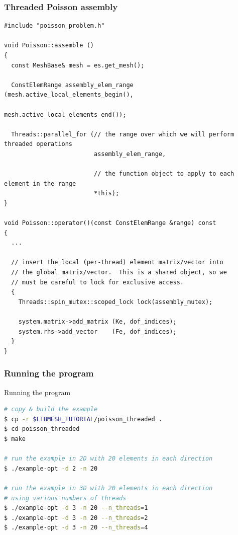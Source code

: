 \begin{frame}
  \frametitle{Threaded Poisson assembly}

  \begin{lstlisting}
#include "poisson_problem.h"

void Poisson::assemble ()
{
  const MeshBase& mesh = es.get_mesh();

  ConstElemRange assembly_elem_range (mesh.active_local_elements_begin(),
                                      mesh.active_local_elements_end());

  Threads::parallel_for (// the range over which we will perform threaded operations
                         assembly_elem_range,

                         // the function object to apply to each element in the range
                         *this);
}

void Poisson::operator()(const ConstElemRange &range) const
{
  ...

  // insert the local (per-thread) element matrix/vector into
  // the global matrix/vector.  This is a shared object, so we
  // must be careful to lock for exclusive access.
  {
    Threads::spin_mutex::scoped_lock lock(assembly_mutex);
    
    system.matrix->add_matrix (Ke, dof_indices);
    system.rhs->add_vector    (Fe, dof_indices);
  }
}
  \end{lstlisting}
\end{frame}
\begin{frame}[fragile]
  \frametitle{Running the program}
    \begin{block}{Running the program}
    \begin{lstlisting}[language=bash]
# copy & build the example
$ cp -r $LIBMESH_TUTORIAL/poisson_threaded .
$ cd poisson_threaded
$ make

# run the example in 2D with 20 elements in each direction
$ ./example-opt -d 2 -n 20 

# run the example in 3D with 20 elements in each direction
# using various numbers of threads
$ ./example-opt -d 3 -n 20 --n_threads=1
$ ./example-opt -d 3 -n 20 --n_threads=2
$ ./example-opt -d 3 -n 20 --n_threads=4

    \end{lstlisting}
  \end{block}
\end{frame}
